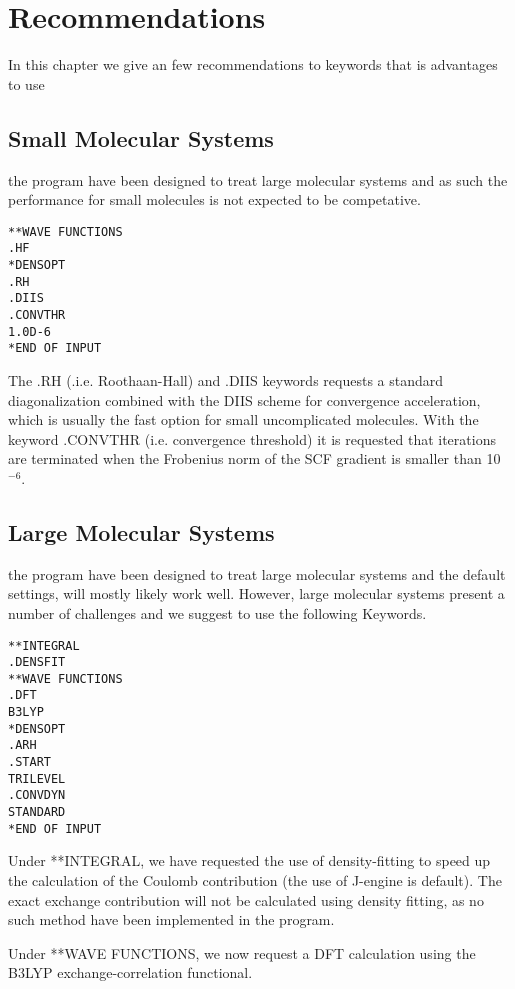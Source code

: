 \chapter{Recommendations }\label{recommendations}

In this chapter we give an few recommendations to keywords that is advantages to use 

\section{Small Molecular Systems}

the {\lsdalton} program have been designed to treat large molecular systems and as such the performance for small molecules is not expected to be competative.
\begin{verbatim}
**WAVE FUNCTIONS
.HF
*DENSOPT
.RH
.DIIS
.CONVTHR
1.0D-6
*END OF INPUT
\end{verbatim}
The .RH (.i.e. Roothaan-Hall) and .DIIS keywords requests a standard diagonalization combined with the DIIS scheme for convergence acceleration, which is usually the fast option for small uncomplicated molecules. 
With the keyword .CONVTHR (i.e. convergence threshold) it is requested that iterations are terminated when the Frobenius norm of the SCF gradient is smaller than 10$^{-6}$. 

\section{Large Molecular Systems}

the {\lsdalton} program have been designed to treat large molecular systems and the default 
settings, will mostly likely work well. However, large molecular systems present a number of 
challenges and we suggest to use the following Keywords.

\begin{verbatim}
**INTEGRAL
.DENSFIT
**WAVE FUNCTIONS
.DFT
B3LYP
*DENSOPT
.ARH
.START
TRILEVEL
.CONVDYN
STANDARD
*END OF INPUT
\end{verbatim}
Under **INTEGRAL, we have requested the use of density-fitting to speed up the calculation of 
the Coulomb contribution (the use of J-engine is default). The exact exchange contribution will not 
be calculated using density fitting, as no such method have been implemented in the {\lsdalton} program.

Under **WAVE FUNCTIONS, we now request a DFT
calculation using the B3LYP exchange-correlation functional.

